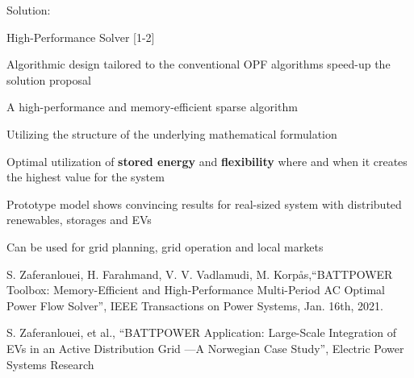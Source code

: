 \documentclass{beamer}
\begin{document}
\begin{frame}{Solution:}
\begin{block}{High-Performance Solver [1-2]}
\begin{itemize}
{\scriptsize
\item Algorithmic design tailored to the conventional OPF algorithms speed-up the solution proposal
\begin{enumerate}[i.]
{\tiny
\item A high-performance and memory-efficient sparse algorithm 
\item Utilizing the structure of the underlying mathematical formulation}
\end{enumerate}
\item Optimal utilization of \textbf{stored energy} and \textbf{flexibility} where and when it creates the highest value for the system
\item Prototype model shows convincing results for real-sized system with distributed renewables, storages and EVs
\item Can be used for grid planning, grid operation and local markets}
\end{itemize}
\end{block}
\begin{enumerate}
{\tiny 
\item S. Zaferanlouei, H. Farahmand, V. V. Vadlamudi, M. Korpås,“BATTPOWER Toolbox: Memory-Efficient and High-Performance Multi-Period AC Optimal Power Flow Solver”, IEEE Transactions on Power Systems, Jan. 16th, 2021.
\item S. Zaferanlouei, et al., “BATTPOWER Application: Large-Scale Integration of EVs in an Active Distribution Grid ---A Norwegian Case Study”, Electric Power Systems Research}
 \end{enumerate}
\end{frame}
\end{document}
